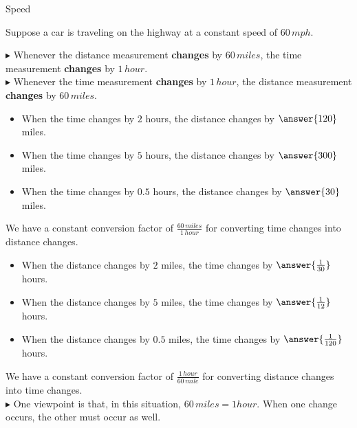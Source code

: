 \documentclass{ximera}
\begin{document}
\begin{example} Speed


Suppose a car is traveling on the highway at a constant speed of $60 \, mph$.


$\blacktriangleright$ Whenever the distance measurement \textbf{\textcolor{purple!85!blue}{changes}} by $60 \, miles$, the time measurement \textbf{\textcolor{purple!85!blue}{changes}} by $1 \, hour$. \\
$\blacktriangleright$ Whenever the time measurement \textbf{\textcolor{purple!85!blue}{changes}} by $1 \, hour$, the distance measurement \textbf{\textcolor{purple!85!blue}{changes}} by $60 \, miles$. \\




\begin{itemize}
\item When the time changes by $2$ hours, the distance changes by $\answer{120}$ miles. \\
\item When the time changes by $5$ hours, the distance changes by $\answer{300}$ miles. \\
\item When the time changes by $0.5$ hours, the distance changes by $\answer{30}$ miles. \\
\end{itemize}



We have a constant conversion factor of $\frac{60 \, miles}{1 \, hour}$ for converting time changes into distance changes. \\






\begin{itemize}
\item When the distance changes by $2$ miles, the time changes by $\answer{\frac{1}{30}}$ hours. \\
\item When the distance changes by $5$ miles, the time changes by $\answer{\frac{1}{12}}$ hours. \\
\item When the distance changes by $0.5$ miles, the time changes by $\answer{\frac{1}{120}}$ hours. \\
\end{itemize}



We have a constant conversion factor of $\frac{1 \, hour}{60 \, mile}$ for converting distance changes into time changes. \\




$\blacktriangleright$ One viewpoint is that, in this situation, $60 \, miles = 1 hour$.  When one change occurs, the other must occur as well.





\end{example} 
\end{document}
